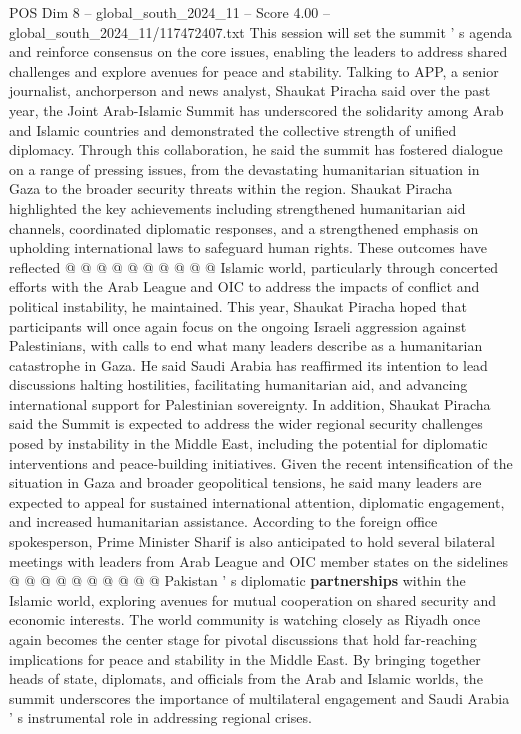 \begin{textsample}{POS Dim 8 – global\_south\_2024\_11 – Score 4.00 – global\_south\_2024\_11/117472407.txt}
This session will set the summit ' s agenda and reinforce consensus on the core issues, enabling the leaders to address shared challenges and explore avenues for peace and stability.
Talking to APP, a senior journalist, anchorperson and news analyst, Shaukat Piracha said over the past year, the Joint Arab-Islamic Summit has underscored the solidarity among Arab and Islamic countries and demonstrated the collective strength of unified diplomacy.
Through this collaboration, he said the summit has fostered dialogue on a range of pressing issues, from the devastating humanitarian situation in Gaza to the broader security threats within the region.
Shaukat Piracha highlighted the key achievements including strengthened humanitarian aid channels, coordinated diplomatic responses, and a strengthened emphasis on upholding international laws to safeguard human rights.
These outcomes have reflected @ @ @ @ @ @ @ @ @ @ Islamic world, particularly through concerted efforts with the Arab League and OIC to address the impacts of conflict and political instability, he maintained.
This year, Shaukat Piracha hoped that participants will once again focus on the ongoing Israeli aggression against Palestinians, with calls to end what many leaders describe as a humanitarian catastrophe in Gaza.
He said Saudi Arabia has reaffirmed its intention to lead discussions halting hostilities, facilitating humanitarian aid, and advancing international support for Palestinian sovereignty.
In addition, Shaukat Piracha said the Summit is expected to address the wider regional security challenges posed by instability in the Middle East, including the potential for diplomatic interventions and peace-building initiatives.
Given the recent intensification of the situation in Gaza and broader geopolitical tensions, he said many leaders are expected to appeal for sustained international attention, diplomatic engagement, and increased humanitarian assistance.
According to the foreign office spokesperson, Prime Minister Sharif is also anticipated to hold several bilateral meetings with leaders from Arab League and OIC member states on the sidelines @ @ @ @ @ @ @ @ @ @ Pakistan ' s diplomatic \textbf{partnerships} within the Islamic world, exploring avenues for mutual cooperation on shared security and economic interests.
The world community is watching closely as Riyadh once again becomes the center stage for pivotal discussions that hold far-reaching implications for peace and stability in the Middle East.
By bringing together heads of state, diplomats, and officials from the Arab and Islamic worlds, the summit underscores the importance of multilateral engagement and Saudi Arabia ' s instrumental role in addressing regional crises.

\end{textsample}
